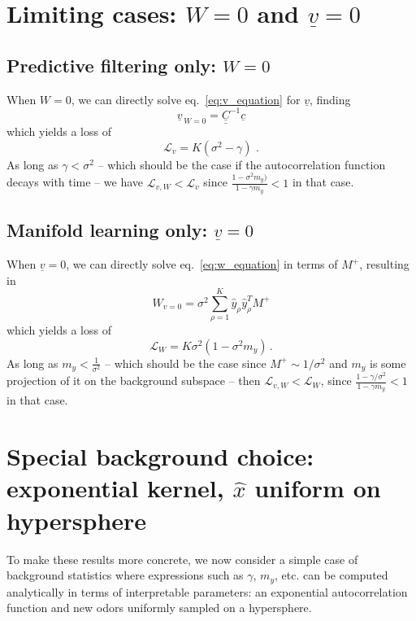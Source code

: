 \documentclass[letter, 12pt]{article}
\def\beq{ \begin{equation} }		%
\def\eeq{ \end{equation} } 			%
\newcommand{\dul}[1]{\underline{\underline{#1}}}
\begin{document}
\section{Limiting cases: $W=0$ and $\underline{v}=0$}
\subsection{Predictive filtering only: $W=0$}
When $W = 0$, we can directly solve eq.~\ref{eq:v_equation} for $\underline{v}$, finding
\begin{equation*}
	\underline{v}_{\,W=0} = \dul{C}^{-1} \underline{c}
\end{equation*}
which yields a loss  of
\beq
	\mathcal{L}_{v} = K (\sigma^2 - \gamma)  \,\, .
	\label{eq:loss_v}
\eeq
As long as $\gamma < \sigma^2$ -- which should be the case if the autocorrelation function decays with time -- we have $\mathcal{L}_{v, W} < \mathcal{L}_v$ since $\frac{1 - \sigma^2 m_y)}{1 - \gamma m_y} < 1$ in that case. 

\subsection{Manifold learning only: $\underline{v} = 0$}
When $\underline{v} = 0$, we can directly solve eq.~\eqref{eq:w_equation} in terms of $M^+$, resulting in
\begin{equation*}
	W_{v=0} = \sigma^2 \sum_{\rho=1}^K \hat{y}_{\rho} \hat{y}_{\rho}^T M^+
\end{equation*}
which yields a loss of 
\beq
	\mathcal{L}_W = K \sigma^2 ( 1 - \sigma^2 m_y) \, .
\eeq
As long as $m_y < \frac{1}{\sigma^2}$ -- which should be the case since $M^+ \sim 1/\sigma^2$ and $m_y$ is some projection of it on the background subspace -- then $\mathcal{L}_{v, W} < \mathcal{L}_W$, since $\frac{1 - \gamma / \sigma^2}{1 - \gamma m_y} < 1$ in that case. 




\section{Special background choice: exponential kernel, $\hat{x}$ uniform on hypersphere}
\label{sec:special_case}
To make these results more concrete, we now consider a simple case of background statistics where expressions such as $\gamma$, $m_y$, etc. can be computed analytically in terms of interpretable parameters: an exponential autocorrelation function and new odors uniformly sampled on a hypersphere. 
\end{document}
